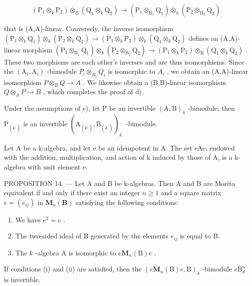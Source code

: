\[
\left(\mathrm{P} _ {1} \otimes_ {k} \mathrm{P} _ {2}\right) \otimes_ {\mathrm{B}} \left(\mathrm{Q} _ {1} \otimes_ {k} \mathrm{Q} _ {2}\right)\rightarrow \left(\mathrm{P} _ {1} \otimes_ {\mathrm{B} _ {1}} \mathrm{Q} _ {1}\right) \otimes_ {k} \left(\mathrm{P} _ {2} \otimes_ {\mathrm{B} _ {2}} \mathrm{Q} _ {2}\right)
\]

that is (A,A)-linear. Conversely, the inverse isomorphism \((\mathrm{P}_{1}\otimes_{k}\mathrm{Q}_{1})\otimes_{k}(\mathrm{P}_{2}\otimes_{k}\mathrm{Q}_{2})\to(\mathrm{P}_{1}\otimes_{k}\mathrm{P}_{2})\otimes_{k}(\mathrm{Q}_{1}\otimes_{k}\mathrm{Q}_{2})\) defines an (A,A)-linear morphism \((\mathrm{P}_{1}\otimes_{\mathrm{B}_{1}}\mathrm{Q}_{1})\otimes_{k}(\mathrm{P}_{2}\otimes_{\mathrm{B}_{2}}\mathrm{Q}_{2})\to(\mathrm{P}_{1}\otimes_{k}\mathrm{P}_{2})\otimes_{\mathrm{B}}(\mathrm{Q}_{1}\otimes_{k}\mathrm{Q}_{2})\) . These two morphisms are each other's inverses and are thus isomorphisms. Since the \((\mathrm{A}_{i},\mathrm{A}_{i})\) -bimodule \(P_{i}\otimes_{B_{i}}Q_{i}\) is isomorphic to \(A_{i}\) , we obtain an (A,A)-linear isomorphism \(P\otimes_{B}Q\to A\) . We likewise obtain a (B,B)-linear isomorphism \(Q\otimes_{A}P\to B\) , which completes the proof of d).

Under the assumptions of e), let P be an invertible \((\mathrm{A},\mathrm{B})_{k}\) -bimodule; then \(\mathrm{P}_{(k^{\prime})}\) is an invertible \((\mathrm{A}_{(k^{\prime})},\mathrm{B}_{(k^{\prime})})_{k^{\prime}}\) -bimodule.

Let A be a k-algebra, and let e be an idempotent in A. The set eAe, endowed with the addition, multiplication, and action of k induced by those of A, is a k-algebra with unit element e.

PROPOSITION 14. --- Let A and B be k-algebras. Then A and B are Morita equivalent if and only if there exist an integer \(n \geqslant 1\) and a square matrix \(e = (e_{ij})\) in \(\mathbf{M}_{n}(\mathbf{B})\) satisfying the following conditions:

\begin{enumerate}
\def\labelenumi{(\roman{enumi})}
\item
  We have \(e^2 = e\) .
\item
  The two-sided ideal of B generated by the elements \(e_{ij}\) is equal to B.
\item
  The \(k\) -algebra A is isomorphic to \(e\mathbf{M}_n(\mathrm{B})e\) .
\end{enumerate}

If conditions (i) and (ii) are satisfied, then the \((e\mathbf{M}_n(\mathrm{B})e,\mathrm{B})_k\) -bimodule \(e\mathrm{B}_d^n\) is invertible.

